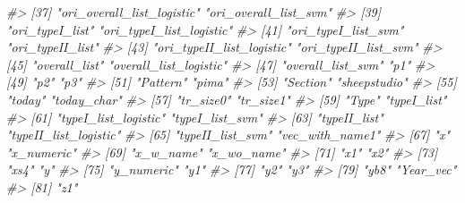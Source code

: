 \documentclass[
]{book}
\newenvironment{Shaded}{\begin{snugshade}}{\end{snugshade}}
\newcommand{\CommentTok}[1]{\textcolor[rgb]{0.56,0.35,0.01}{\textit{#1}}}
\begin{document}
\begin{Shaded}
\begin{Highlighting}[]
\CommentTok{\#\textgreater{} [37] "ori\_overall\_list\_logistic"          "ori\_overall\_list\_svm"              }
\CommentTok{\#\textgreater{} [39] "ori\_typeI\_list"                     "ori\_typeI\_list\_logistic"           }
\CommentTok{\#\textgreater{} [41] "ori\_typeI\_list\_svm"                 "ori\_typeII\_list"                   }
\CommentTok{\#\textgreater{} [43] "ori\_typeII\_list\_logistic"           "ori\_typeII\_list\_svm"               }
\CommentTok{\#\textgreater{} [45] "overall\_list"                       "overall\_list\_logistic"             }
\CommentTok{\#\textgreater{} [47] "overall\_list\_svm"                   "p1"                                }
\CommentTok{\#\textgreater{} [49] "p2"                                 "p3"                                }
\CommentTok{\#\textgreater{} [51] "Pattern"                            "pima"                              }
\CommentTok{\#\textgreater{} [53] "Section"                            "sheepstudio"                       }
\CommentTok{\#\textgreater{} [55] "today"                              "today\_char"                        }
\CommentTok{\#\textgreater{} [57] "tr\_size0"                           "tr\_size1"                          }
\CommentTok{\#\textgreater{} [59] "Type"                               "typeI\_list"                        }
\CommentTok{\#\textgreater{} [61] "typeI\_list\_logistic"                "typeI\_list\_svm"                    }
\CommentTok{\#\textgreater{} [63] "typeII\_list"                        "typeII\_list\_logistic"              }
\CommentTok{\#\textgreater{} [65] "typeII\_list\_svm"                    "vec\_with\_name1"                    }
\CommentTok{\#\textgreater{} [67] "x"                                  "x\_numeric"                         }
\CommentTok{\#\textgreater{} [69] "x\_w\_name"                           "x\_wo\_name"                         }
\CommentTok{\#\textgreater{} [71] "x1"                                 "x2"                                }
\CommentTok{\#\textgreater{} [73] "xs4"                                "y"                                 }
\CommentTok{\#\textgreater{} [75] "y\_numeric"                          "y1"                                }
\CommentTok{\#\textgreater{} [77] "y2"                                 "y3"                                }
\CommentTok{\#\textgreater{} [79] "yb8"                                "Year\_vec"                          }
\CommentTok{\#\textgreater{} [81] "z1"}
\end{Highlighting}
\end{Shaded}
\end{document}
